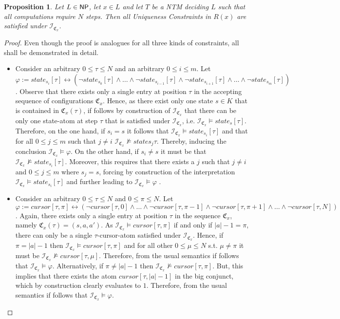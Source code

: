 \documentclass [11pt]{article}
\newtheorem{proposition}[theorem]{Proposition}
\newcommand{\nmodels}{\not\models}
\newcommand{\ccfont}[1]{\protect\mathsf{#1}}
\newcommand{\NP}{\ccfont{NP}}
\newcommand{\cursor}[2]{\textit{cursor}[#1,#2]}
\newcommand{\state}[2]{\textit{state}_{#1}[#2]}
\newcommand{\sequ}[1]{\mathfrak{C}_{#1}}
\newcommand{\sequint}[2]{ \mathcal{#1}_{\mathfrak{C}_{#2}}}
\begin{document}
\begin{proposition}
\label{prop:r-uniqueness}
Let $L \in \NP$, let $x \in L$ and let $T$ be a NTM deciding $L$ such that all computations require $N$ steps. Then all \emph{Uniqueness Constraints} in $R(x)$ are satisfied under $\sequint{I}{x}$.
\end{proposition}
\begin{proof}
Even though the proof is analogues for all three kinds of constraints, all shall be demonstrated in detail. 
\begin{itemize}
\item
Consider an arbitrary $0\leq \tau \leq N$ and an arbitrary $0 \leq i \leq m$. Let $\varphi:=\state{s_i}{\tau} \leftrightarrow (\neg \state{s_0}{\tau} \wedge \dots \wedge \neg \state{s_{i-1}}{\tau} \wedge  \neg \state{s_{i+1}}{\tau} \wedge \dots \wedge \neg \state{s_{m}}{\tau})$.
Observe that there exists only a single entry at position $\tau$ in the accepting sequence of configurations $\sequ{x}$.
Hence, as there exist only one state $s \in K$ that is contained in $\sequ{x}(\tau)$, if follows by construction of $\sequint{I}{x}$ that there can be only one state-atom at step $\tau$ that is satisfied under $\sequint{I}{x}$, i.e. $\sequint{I}{x} \models \state{s}{\tau} $. Therefore, on the one hand, if $s_i=s$ it follows that $\sequint{I}{x} \models  \state{s_i}{\tau}$ and that for all $0 \leq j \leq m$ such that $j \neq i$ $\sequint{I}{x} \nmodels  state{s_j}{\tau}$. Thereby, inducing the conclusion $\sequint{I}{x} \models  \varphi$. On the other hand, if $s_i \neq s$ it must be that
$\sequint{I}{x} \nmodels \state{s_i}{\tau}$. Moreover, this requires that there exists a $j$ such that $j\neq i$ and  $0 \leq j \leq m$ where $s_j = s$, forcing by construction of the interpretation $\sequint{I}{x} \models \state{s_i}{\tau}$ and further leading to $\sequint{I}{x} \models \varphi$ . 

\item 
Consider an arbitrary $0\leq \tau \leq N$ and $0 \leq \pi \leq  N$.
Let $\varphi := \cursor{\tau}{\pi} \leftrightarrow (\neg \cursor{\tau}{0} \wedge \dots \wedge \neg \cursor{\tau}{\pi - 1}  \wedge \neg \cursor{\tau}{\pi+1} \wedge \dots \wedge \neg \cursor{\tau}{N})$.
Again, there exists only a single entry at position $\tau$ in the sequence $\sequ{x}$, namely $\sequ{x}(\tau)=(s,a,a')$. As $\sequint{I}{x} \models   \cursor{\tau}{\pi} $ if and only if $|a|-1=\pi$, there can only be a single $\tau$-cursor-atom satisfied under $\sequint{I}{x}$.
Hence, if $\pi=|a|-1$ then $\sequint{I}{x} \models   \cursor{\tau}{\pi}$ and for all other $0 \leq \mu \leq  N$ s.t. $\mu \neq \pi$ it must be $\sequint{I}{x} \nmodels  \cursor{\tau}{\mu}$. Therefore, from the usual semantics if follows that $\sequint{I}{x} \models  \varphi$.
Alternatively, if $\pi\neq|a|-1$ then $\sequint{I}{x} \nmodels  \cursor{\tau}{\pi}$. But, this implies that there exists the atom $ \cursor{\tau}{|a|-1}$ in the big conjunct, which by construction clearly evaluates to $1$.  Therefore, from the usual semantics if follows that $\sequint{I}{x} \models  \varphi$.


\end{itemize}
\end{proof}
\end{document}

